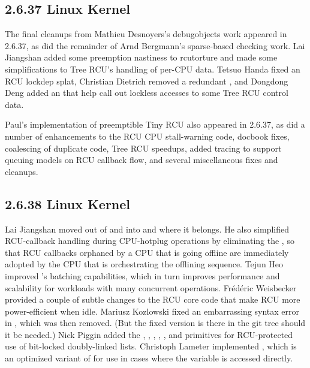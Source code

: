 \subsection{2.6.37 Linux Kernel}

The final cleanups from Mathieu Desnoyers's debugobjects work appeared
in 2.6.37, as did the remainder of Arnd Bergmann's sparse-based checking work.
Lai Jiangshan added some preemption nastiness to rcutorture and
made some simplifications to Tree RCU's handling of per-CPU data.
Tetsuo Handa fixed an RCU lockdep splat, Christian Dietrich removed
a redundant , and Dongdong Deng added an
 that help call out lockless accesses to some
Tree RCU control data.

Paul's implementation of preemptible Tiny RCU also appeared in
2.6.37, as did a number of enhancements to the RCU CPU stall-warning
code, docbook fixes, coalescing of duplicate code, Tree RCU speedups,
added tracing to support queuing models on RCU callback flow,
and several miscellaneous fixes and cleanups.

\subsection{2.6.38 Linux Kernel}

Lai Jiangshan moved  out of
 and into  and
 where it belongs.
He also simplified RCU-callback handling during CPU-hotplug operations
by eliminating the , so that RCU callbacks
orphaned by a CPU that is going offline are immediately adopted by
the CPU that is orchestrating the offlining sequence.
Tejun Heo improved 's batching
capabilities, which in turn improves performance and scalability
for workloads with many concurrent 
operations.
Fr\'ed\'eric Weisbecker provided a couple of subtle changes to the
RCU core code that make RCU more power-efficient when idle.
Mariusz Kozlowski fixed an embarrassing syntax error in
, which was then removed.
(But the fixed version is there in the git tree should it be needed.)
Nick Piggin added the ,
,
,
,
, and
 primitives for RCU-protected use
of bit-locked doubly-linked lists.
Christoph Lameter implemented , which is an
optimized variant of
 for use in cases where the variable is accessed directly.

